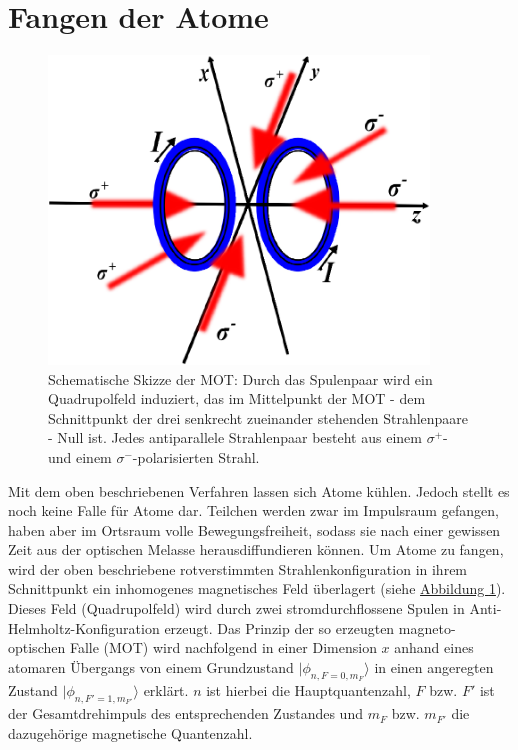 \documentclass[
class=book,
accentcolor=1b,
custommargins=geometry,
fontsize=11pt,
thesis={type=Versuchsanleitung},
ruledheaders=all,
headline=false,
instbox=false,
marginpar=false,
title=small,
ignore-missing-data=true,
twoside=false,
logofile=apqdesign/tuda_logo.pdf,
pdfa=false %
]{apqpub}
\begin{document}
				\section{Fangen der Atome}	
				\begin{figure}[htb!]
					\centering
					\includegraphics[width=0.9\textwidth]{graphics/MOTSS.jpg}
					\caption{Schematische Skizze der MOT: Durch das Spulenpaar wird ein Quadrupolfeld induziert, das im Mittelpunkt der MOT - dem Schnittpunkt der drei senkrecht zueinander stehenden Strahlenpaare - Null
						ist. Jedes antiparallele Strahlenpaar besteht aus einem $\sigma^+$- und einem $\sigma^-$-polarisierten Strahl.}
					\label{fig:MOTSS}
				\end{figure}	
				Mit dem oben beschriebenen Verfahren lassen sich Atome kühlen. 
				Jedoch stellt es noch keine Falle für Atome dar. 
				Teilchen werden zwar im Impulsraum gefangen, haben aber im Ortsraum volle Bewegungsfreiheit, sodass sie nach einer gewissen Zeit aus der optischen Melasse herausdiffundieren können. 
				Um Atome zu fangen, wird der oben beschriebene rotverstimmten Strahlenkonfiguration in ihrem Schnittpunkt ein inhomogenes magnetisches Feld überlagert (siehe \hyperref[fig:MOTSS]{Abbildung \ref{fig:MOTSS}}). 
				Dieses Feld (Quadrupolfeld) wird durch zwei stromdurchflossene Spulen in Anti-Helmholtz-Konfiguration erzeugt. 
				Das Prinzip der so erzeugten magneto-optischen Falle (MOT) wird nachfolgend in einer Dimension $x$ anhand eines atomaren Übergangs von einem Grundzustand $\lvert \phi_{n,F=0,m_F}\rangle$ in einen angeregten Zustand $\lvert \phi_{n,F'=1,m_{F'}}\rangle$ erklärt.
				$n$ ist hierbei die Hauptquantenzahl, $F$ bzw. $F'$ ist der Gesamtdrehimpuls des entsprechenden Zustandes und $m_F$ bzw. $m_{F'}$ die dazugehörige magnetische Quantenzahl. 
\end{document}
